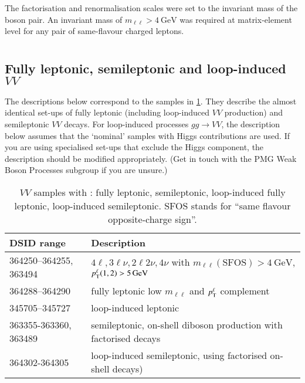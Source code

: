 The factorisation and renormalisation scales were set to the invariant mass of
the boson pair. An invariant mass of \(m_{\ell\ell} > \qty{4}{\GeV}\) was required
at matrix-element level for any pair of same-flavour charged leptons.


\section[Sherpa]{\SHERPA}

\subsection{Fully leptonic, semileptonic and loop-induced \texorpdfstring{\(VV\)}{VV}}

The descriptions below correspond to the samples in
\cref{tab:MB-sherpa}. They describe the almost
identical set-ups of fully leptonic (including loop-induced \(VV\) production)
and semileptonic \(VV\) decays. For loop-induced processes \(gg\to VV\),
the description below assumes that the `nominal' samples with
Higgs contributions are used. If you are using specialised set-ups that
exclude the Higgs component, the description should be modified appropriately.
(Get in touch with the PMG Weak Boson Processes subgroup if you are unsure.)

\begin{table}[htbp]
  \caption{\(VV\) samples with \SHERPA: fully leptonic, semileptonic,
    loop-induced fully leptonic, loop-induced semileptonic. SFOS stands for
    \enquote{same flavour opposite-charge sign}.}%
  \label{tab:MB-sherpa}
  \centering
  \begin{tabular}{l l}
    \toprule
    DSID range & Description \\
    \midrule
    364250--364255, 363494   & \(4\ell, 3\ell\nu, 2\ell 2\nu, 4\nu\) with \(m_{\ell\ell}\mathrm{(SFOS)} > \qty{4}{\GeV}\), \(\pTX[\ell](1,2) > \qty{5}{\GeV}\)\\
    364288--364290 & fully leptonic low \(m_{\ell\ell}\) and \(\pTX[\ell]\) complement\\
    \midrule
    345705--345727   & loop-induced leptonic\\
    \midrule
    363355-363360, 363489   & semileptonic, on-shell diboson production with factorised decays\\
    \midrule
    364302-364305   & loop-induced semileptonic, using factorised on-shell decays)\\
    \bottomrule
  \end{tabular}
\end{table}

